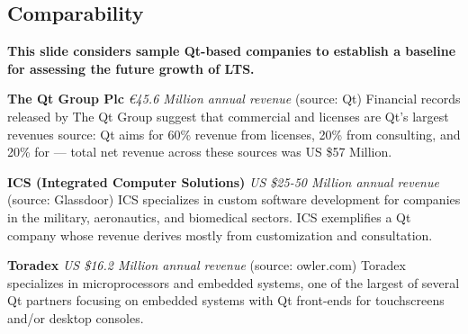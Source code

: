 
\begin{frame}{}
\section{Comparability}
\vspace{.5em}	

{\Large%
\hspace*{-2pt}\begin{minipage}{\textwidth}
\vspace{-4pt}


		


{\hspace{1.5em}\begin{minipage}[l]{.9\textwidth}\Large\centering\color{slidePartHeadColor} 	
{\LARGE \textbf{This slide considers sample Qt-based companies to establish a baseline for assessing 
	the future growth of LTS.}}
\vspace{.7em}	
\end{minipage}}
\vspace{.8em}

{\LARGE \setlength{\leftmargini}{30pt}\begin{enumerate}
\dmitem \textbf{The Qt Group Plc} 
\textit{\euro{}45.6 Million annual revenue} (source: Qt)
Financial records released by The Qt Group suggest that commercial 
 and  licenses 
are Qt's largest revenues source: Qt  
aims for 60\% revenue from licenses, 20\% from 
consulting, and 20\% for  
--- total net revenue across these sources was 
US \$57 Million.\vspace{20pt}

\dmitem \textbf{ICS (Integrated Computer Solutions)} 
\textit{US \$25-50 Million annual revenue} (source: Glassdoor)
ICS specializes in custom software development 
for companies in the military, aeronautics, and 
biomedical sectors.  ICS exemplifies a 
Qt company whose revenue derives mostly from 
customization and consultation.\vspace{20pt}

\dmitem \textbf{Toradex} 
\textit{US \$16.2 Million annual revenue} (source: owler.com)
Toradex specializes in microprocessors 
and embedded systems, one of the largest 
of several Qt partners focusing on 
embedded systems with Qt front-ends 
for touchscreens and/or desktop consoles.


\end{enumerate}}
\end{minipage}

}

\end{frame}
